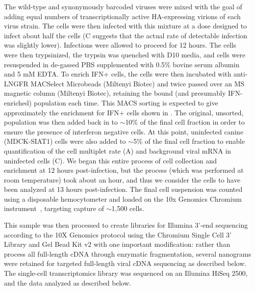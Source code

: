 \documentclass[9pt,lineno]{template}
\begin{document}
The wild-type and synonymously barcoded viruses were mixed with the goal of adding equal numbers of transcriptionally active HA-expressing virions of each virus strain.
The cells were then infected with this mixture at a dose designed to infect about half the cells (C suggests that the actual rate of detectable infection was slightly lower).
Infections were allowed to proceed for 12 hours.
The cells were then trypsinized, the trypsin was quenched with D10 media, and cells were resuspended in de-gassed PBS supplemented with 0.5\% bovine serum albumin and 5 mM EDTA. 
To enrich IFN+ cells, the cells were then incubated with anti-LNGFR MACSelect Microbeads (Miltenyi Biotec) and twice passed over an MS magnetic column (Miltenyi Biotec), retaining the bound (and presumably IFN-enriched) population each time. 
This MACS sorting is expected to give approximately the enrichment for IFN+ cells shown in .
The original, unsorted, population was then added back in to $\sim$10\% of the final cell fraction in order to ensure the presence of interferon negative cells. 
At this point, uninfected canine (MDCK-SIAT1) cells were also added to $\sim$5\% of the final cell fraction to enable quantification of the cell multiplet rate (A) and background viral mRNA in uninfected cells (C). 
We began this entire process of cell collection and enrichment at 12 hours post-infection, but the process (which was performed at room temperature) took about an hour, and thus we consider the cells to have been analyzed at 13 hours post-infection.
The final cell suspension was counted using a disposable hemocytometer and loaded on the 10x Genomics Chromium instrument~\citep{zheng2017massively}, targeting capture of $\sim$1,500 cells. 

This sample was then processed to create libraries for Illumina 3'-end sequencing according to the 10X Genomics protocol using the Chromium Single Cell 3' Library and Gel Bead Kit v2 with one important modification: rather than process all full-length cDNA through enzymatic fragmentation, several nanograms were retained for targeted full-length viral cDNA sequencing as described below.
The single-cell transcriptomics library was sequenced on an Illumina HiSeq 2500, and the data analyzed as described below.
\end{document}
